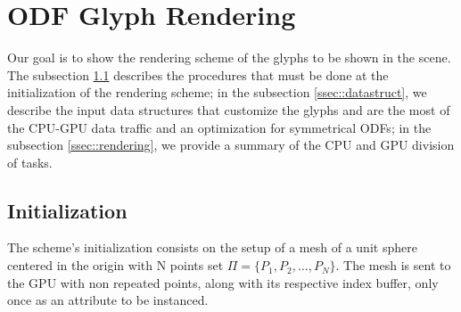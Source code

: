 \documentclass[twoside,twocolumn,10pt]{article}
\begin{document}

\section{ODF Glyph Rendering}
\label{sec::odf_glyph_rendering}

Our goal is to show the rendering scheme of the glyphs to be shown in the scene. The subsection \ref{ssec::precomputation} describes the procedures that must be done at the initialization of the rendering scheme; in the subsection \ref{ssec::datastruct}, we describe the input data structures that customize the glyphs and are the most of the CPU-GPU data traffic and an optimization for symmetrical ODFs; in the subsection \ref{ssec::rendering}, we provide a summary of the CPU and GPU division of tasks.%




\subsection{Initialization}
\label{ssec::precomputation}


The scheme's initialization consists on the setup of a mesh of a unit sphere centered in the origin with N points set $\Pi = \{P_1, P_2, \dots, P_N\}$. The mesh is sent to the GPU with non repeated points, along with its respective index buffer, only once as an attribute to be instanced.



\end{document}

